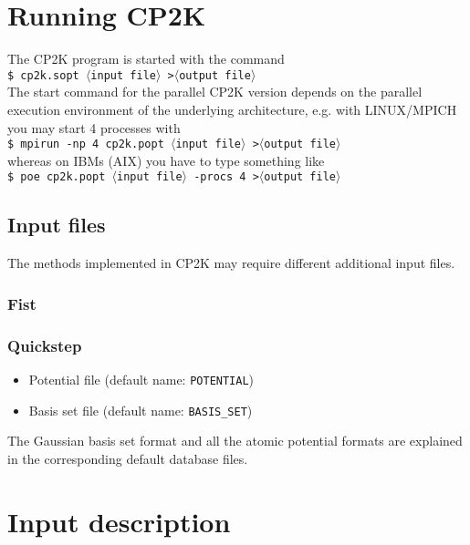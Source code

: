 \documentclass[12pt,twoside,a4paper]{article}
\newcommand{\bi}{\begin{itemize}}
\newcommand{\ei}{\end{itemize}}
\newcommand{\la}{$\langle$}
\newcommand{\ra}{$\rangle$}
\begin{document}
\section{Running CP2K}
%
The CP2K program is started with the command\\[2mm]
{\tt \$ cp2k.sopt \la{\rm input file}\ra\ >\la{\rm output file}\ra}\\[2mm]
The start command for the parallel CP2K version depends on the parallel
execution environment of the underlying architecture, e.g.
with LINUX/MPICH you may start 4 processes with\\[2mm]
{\tt \$ mpirun -np 4 cp2k.popt \la{\rm input file}\ra\ >\la{\rm output file}\ra}\\[2mm]
whereas on IBMs (AIX) you have to type something like\\[2mm]
{\tt \$ poe cp2k.popt \la{\rm input file}\ra\ -procs 4 >\la{\rm output file}\ra}
%
\subsection{Input files}
%
The methods implemented in CP2K may require different additional input files.
%
\subsubsection{Fist}
%
\subsubsection{Quickstep}
%
\bi
 \item Potential file (default name: {\tt POTENTIAL})
 \item Basis set file (default name: {\tt BASIS\_SET})
\ei
The Gaussian basis set format and all the atomic potential formats are
explained in the corresponding default database files.
\newpage
%
\section{Input description}
%
\end{document}
